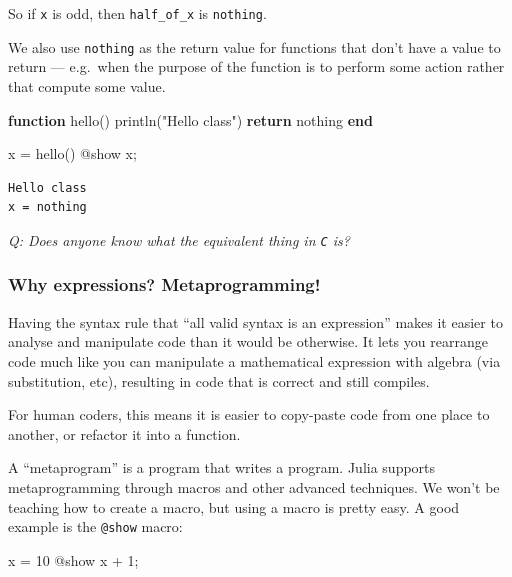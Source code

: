 \documentclass[
]{article}
\newenvironment{Shaded}{\begin{snugshade}}{\end{snugshade}}
\newcommand{\ConstantTok}[1]{\textcolor[rgb]{0.56,0.35,0.01}{#1}}
\newcommand{\ControlFlowTok}[1]{\textcolor[rgb]{0.00,0.23,0.31}{\textbf{#1}}}
\newcommand{\FloatTok}[1]{\textcolor[rgb]{0.68,0.00,0.00}{#1}}
\newcommand{\FunctionTok}[1]{\textcolor[rgb]{0.28,0.35,0.67}{#1}}
\newcommand{\KeywordTok}[1]{\textcolor[rgb]{0.00,0.23,0.31}{\textbf{#1}}}
\newcommand{\NormalTok}[1]{\textcolor[rgb]{0.00,0.23,0.31}{#1}}
\newcommand{\OperatorTok}[1]{\textcolor[rgb]{0.37,0.37,0.37}{#1}}
\newcommand{\PreprocessorTok}[1]{\textcolor[rgb]{0.68,0.00,0.00}{#1}}
\newcommand{\StringTok}[1]{\textcolor[rgb]{0.13,0.47,0.30}{#1}}
\begin{document}
So if \texttt{x} is odd, then \texttt{half\_of\_x} is \texttt{nothing}.

We also use \texttt{nothing} as the return value for functions that
don't have a value to return --- e.g.~when the purpose of the function
is to perform some action rather that compute some value.

\begin{Shaded}
\begin{Highlighting}[]
\KeywordTok{function} \FunctionTok{hello}\NormalTok{()}
   \FunctionTok{println}\NormalTok{(}\StringTok{"Hello class"}\NormalTok{)}
   \ControlFlowTok{return} \ConstantTok{nothing}
\KeywordTok{end}

\NormalTok{x }\OperatorTok{=} \FunctionTok{hello}\NormalTok{()}
\PreprocessorTok{@show}\NormalTok{ x;}
\end{Highlighting}
\end{Shaded}

\begin{verbatim}
Hello class
x = nothing
\end{verbatim}

\emph{Q: Does anyone know what the equivalent thing in \texttt{C} is?}

\subsubsection{Why expressions?
Metaprogramming!}\label{why-expressions-metaprogramming}

Having the syntax rule that ``all valid syntax is an expression'' makes
it easier to analyse and manipulate code than it would be otherwise. It
lets you rearrange code much like you can manipulate a mathematical
expression with algebra (via substitution, etc), resulting in code that
is correct and still compiles.

For human coders, this means it is easier to copy-paste code from one
place to another, or refactor it into a function.

A ``metaprogram'' is a program that writes a program. Julia supports
metaprogramming through macros and other advanced techniques. We won't
be teaching how to create a macro, but using a macro is pretty easy. A
good example is the \texttt{@show} macro:

\begin{Shaded}
\begin{Highlighting}[]
\NormalTok{x }\OperatorTok{=} \FloatTok{10}
\PreprocessorTok{@show}\NormalTok{ x }\OperatorTok{+} \FloatTok{1}\NormalTok{;}
\end{Highlighting}
\end{Shaded}
\end{document}
